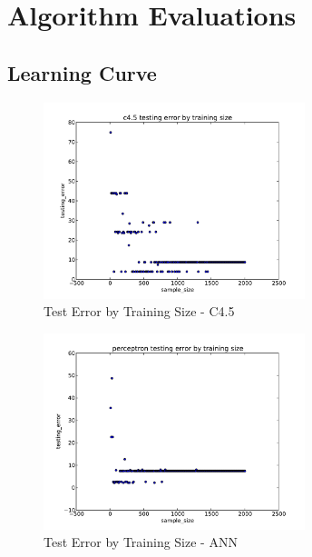 \documentclass{acm_proc_article-sp}
\begin{document}
\section{Algorithm Evaluations}

\subsection{Learning Curve}

\begin{figure}[te-c45]
\centering
\includegraphics[width=3in]{data/agaricus-lepiota/learning-curve-10to2000/test-error-c45.pdf}
\caption{Test Error by Training Size - C4.5}
\end{figure} 

\begin{figure}[te-perceptron]
\centering
\includegraphics[width=3in]{data/agaricus-lepiota/learning-curve-10to2000/test-error-perceptron.pdf}
\caption{Test Error by Training Size - ANN}
\end{figure} 
\end{document}
